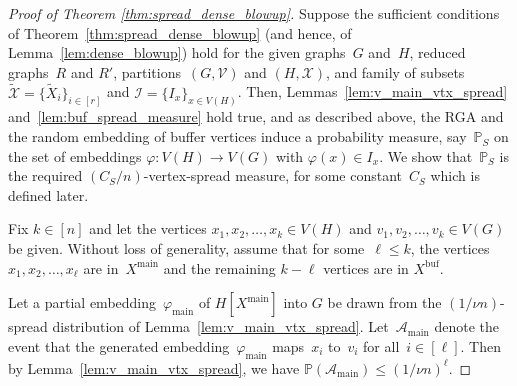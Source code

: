 \documentclass[final]{article}
\theoremstyle{definition}
\newcommand{\main}{\mathrm{main}}
\newcommand{\buf}{\mathrm{buf}}
\let\tilde\widetilde
\begin{document}
\begin{proof}[Proof of Theorem \ref{thm:spread_dense_blowup}]
    Suppose the sufficient conditions of Theorem~\ref{thm:spread_dense_blowup} (and hence, of Lemma~\ref{lem:dense_blowup}) hold for the given graphs~$G$ and~$H$, reduced graphs~$R$ and $R'$, partitions~$(G, \mathcal{V})$ and $(H, \mathcal{X})$, and family of subsets~$\tilde{\mathcal{X}} = \{\tilde{X}_i\}_{i \in [r]}$ and $\mathcal{I} = \{I_x\}_{x \in V(H)}$. Then, Lemmas~\ref{lem:v_main_vtx_spread} and~\ref{lem:buf_spread_measure} hold true, and as described above, the RGA and the random embedding of buffer vertices induce a probability measure, say~$\mathds{P}_S$ on the set of embeddings $\varphi: V(H) \to V(G)$ with $\varphi(x) \in I_x$. We show that~$\mathds{P}_S$ is the required $(C_S/n)$-vertex-spread measure, for some constant~$C_S$ which is defined later. 
    
    Fix $k \in [n]$ and let the vertices $x_1, x_2, \dots, x_k \in V(H)$ and $v_1, v_2, \dots, v_k \in V(G)$ be given. Without loss of generality, assume that for some~$\ell \leq k$, the vertices $x_1, x_2, \dots, x_\ell$ are in~$X^{\main}$ and the remaining $k-\ell$ vertices are in $X^{\buf}$.

    Let a partial embedding~$\varphi_{\main}$ of $H[X^{\main}]$ into $G$ be drawn from the $(1/\nu n)$-spread distribution of Lemma~\ref{lem:v_main_vtx_spread}. Let~$\mathcal{A}_{\main}$ denote the event that the generated embedding~$\varphi_{\main}$ maps~$x_i$ to~$v_i$ for all~$i \in [\ell]$. Then by Lemma~\ref{lem:v_main_vtx_spread}, we have $\mathds{P}(\mathcal{A}_{\main}) \leq (1/\nu n)^\ell$. 


\end{proof}
\end{document}
